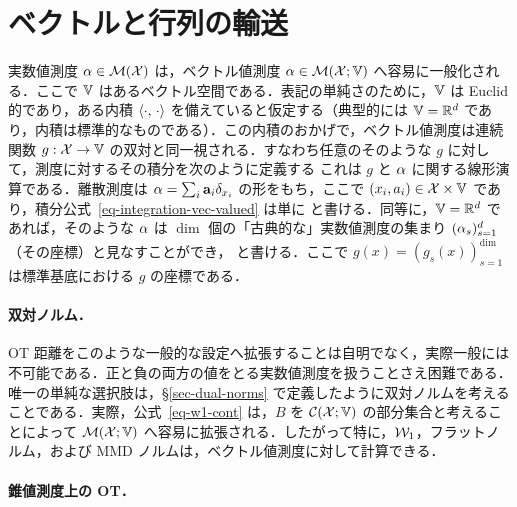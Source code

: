 \section{ベクトルと行列の輸送}

実数値測度 $\alpha \in \mathcal{M}(\mathcal{X})$ は，ベクトル値測度 $\alpha \in \mathcal{M}(\mathcal{X};\mathbb{V})$ へ容易に一般化される．ここで $\mathbb{V}$ はあるベクトル空間である．表記の単純さのために，$\mathbb{V}$ は Euclid 的であり，ある内積 $\langle \cdot,\,\cdot\rangle$ を備えていると仮定する（典型的には $\mathbb{V}=\mathbb{R}^d$ であり，内積は標準的なものである）．この内積のおかげで，ベクトル値測度は連続関数 $g : \mathcal{X} \rightarrow \mathbb{V}$ の双対と同一視される．すなわち任意のそのような $g$ に対して，測度に対するその積分を次のように定義する
これは $g$ と $\alpha$ に関する線形演算である．離散測度は $\alpha = \sum_i \mathrm{\textbf{a}}_i \delta_{x_i}$ の形をもち，ここで $(x_i,a_i) \in \mathcal{X} \times \mathbb{V}$ であり，積分公式~\eqref{eq-integration-vec-valued} は単に
と書ける．同等に，$\mathbb{V}=\mathbb{R}^d$ であれば，そのような $\alpha$ は $\dim$ 個の「古典的な」実数値測度の集まり $(\alpha_s)_{s=1}^d$（その座標）と見なすことができ，
と書ける．ここで $g(x)=(g_s(x))_{s=1}^\dim$ は標準基底における $g$ の座標である．

\paragraph{双対ノルム．}

OT 距離をこのような一般的な設定へ拡張することは自明でなく，実際一般には不可能である．正と負の両方の値をとる実数値測度を扱うことさえ困難である．唯一の単純な選択肢は，\S\ref{sec-dual-norms} で定義したように双対ノルムを考えることである．実際，公式~\eqref{eq-w1-cont} は，$B$ を $\mathcal{C}(\mathcal{X};\mathbb{V})$ の部分集合と考えることによって $\mathcal{M}(\mathcal{X};\mathbb{V})$ へ容易に拡張される．したがって特に，$\mathcal{W}_1$，フラットノルム，および MMD ノルムは，ベクトル値測度に対して計算できる．

\paragraph{錐値測度上の OT．}

